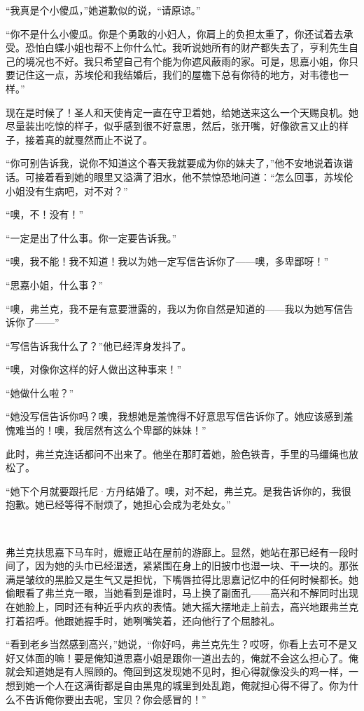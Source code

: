 \par “我真是个小傻瓜，”她道歉似的说，“请原谅。”
\par “你不是什么小傻瓜。你是个勇敢的小妇人，你肩上的负担太重了，你还试着去承受。恐怕白蝶小姐也帮不上你什么忙。我听说她所有的财产都失去了，亨利先生自己的境况也不好。我只希望自己有个能为你遮风蔽雨的家。可是，思嘉小姐，你只要记住这一点，苏埃伦和我结婚后，我们的屋檐下总有你待的地方，对韦德也一样。”
\par 现在是时候了！圣人和天使肯定一直在守卫着她，给她送来这么一个天赐良机。她尽量装出吃惊的样子，似乎感到很不好意思，然后，张开嘴，好像欲言又止的样子，接着真的就戛然而止不说了。
\par “你可别告诉我，说你不知道这个春天我就要成为你的妹夫了，”他不安地说着诙谐话。可接着看到她的眼里又溢满了泪水，他不禁惊恐地问道：“怎么回事，苏埃伦小姐没有生病吧，对不对？”
\par “噢，不！没有！”
\par “一定是出了什么事。你一定要告诉我。”
\par “噢，我不能！我不知道！我以为她一定写信告诉你了——噢，多卑鄙呀！”
\par “思嘉小姐，什么事？”
\par “噢，弗兰克，我不是有意要泄露的，我以为你自然是知道的——我以为她写信告诉你了——”
\par “写信告诉我什么了？”他已经浑身发抖了。
\par “噢，对像你这样的好人做出这种事来！”
\par “她做什么啦？”
\par “她没写信告诉你吗？噢，我想她是羞愧得不好意思写信告诉你了。她应该感到羞愧难当的！噢，我居然有这么个卑鄙的妹妹！”
\par 此时，弗兰克连话都问不出来了。他坐在那盯着她，脸色铁青，手里的马缰绳也放松了。
\par “她下个月就要跟托尼·方丹结婚了。噢，对不起，弗兰克。是我告诉你的，我很抱歉。她已经等得不耐烦了，她担心会成为老处女。”
\par  
\par 弗兰克扶思嘉下马车时，嬷嬷正站在屋前的游廊上。显然，她站在那已经有一段时间了，因为她的头巾已经湿透，紧紧围在身上的旧披巾也湿一块、干一块的。那张满是皱纹的黑脸又是生气又是担忧，下嘴唇拉得比思嘉记忆中的任何时候都长。她偷眼看了弗兰克一眼，当她看到是谁时，马上换了副面孔——高兴和不解同时出现在她脸上，同时还有种近乎内疚的表情。她大摇大摆地走上前去，高兴地跟弗兰克打着招呼。他跟她握手时，她咧嘴笑着，还向他行了个屈膝礼。
\par “看到老乡当然感到高兴，”她说，“你好吗，弗兰克先生？哎呀，你看上去可不是又好又体面的嘛！要是俺知道思嘉小姐是跟你一道出去的，俺就不会这么担心了。俺就会知道她是有人照顾的。俺回到这发现她不见时，担心得就像没头的鸡一样，一想到她一个人在这满街都是自由黑鬼的城里到处乱跑，俺就担心得不得了。你为什么不告诉俺你要出去呢，宝贝？你会感冒的！”
